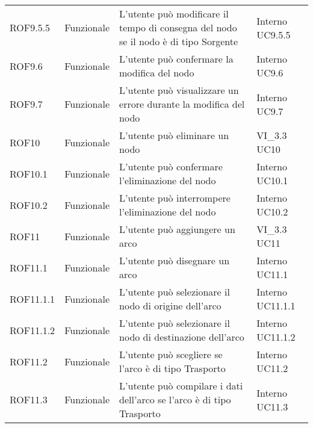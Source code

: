 \begin{longtable}{p{2cm}!{\VRule[1pt]}p{2cm}!{\VRule[1pt]}p{5cm}!{\VRule[1pt]}p{1.5cm}}
\\
ROF9.5.5&Funzionale\newline  & L'utente può modificare il tempo di consegna del nodo se il nodo è di tipo Sorgente & Interno \newline UC9.5.5
\\
ROF9.6&Funzionale\newline  & L'utente può confermare la modifica del nodo & Interno \newline UC9.6
\\
ROF9.7&Funzionale\newline  & L'utente può visualizzare un errore durante la modifica del nodo & Interno \newline UC9.7
\\
ROF10&Funzionale\newline  & L'utente può eliminare un nodo & VI_3.3 \newline UC10
 \\
ROF10.1&Funzionale\newline  & L'utente può confermare l'eliminazione del nodo & Interno \newline UC10.1
 \\
ROF10.2&Funzionale\newline  & L'utente può interrompere l'eliminazione del nodo & Interno \newline UC10.2
 \\
ROF11&Funzionale\newline  & L'utente può aggiungere un arco & VI_3.3 \newline UC11
 \\
ROF11.1&Funzionale\newline  & L'utente può disegnare un arco & Interno \newline UC11.1
 \\
ROF11.1.1&Funzionale\newline  & L'utente può selezionare il nodo di origine dell'arco & Interno \newline UC11.1.1
 \\
ROF11.1.2&Funzionale\newline  & L'utente può selezionare il nodo di destinazione dell'arco & Interno \newline UC11.1.2
 \\
ROF11.2&Funzionale\newline  & L'utente può scegliere se l'arco è di tipo Trasporto & Interno \newline UC11.2
 \\
ROF11.3&Funzionale\newline  & L'utente può compilare i dati dell'arco se l'arco è di tipo Trasporto & Interno \newline UC11.3

\end{longtable}
